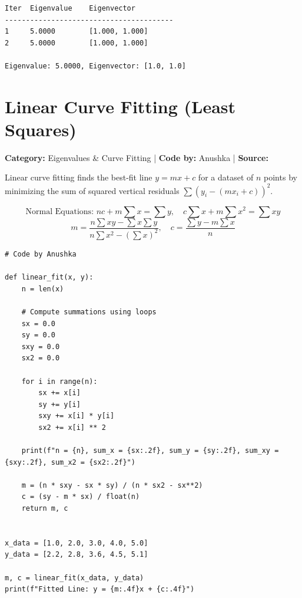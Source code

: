 \documentclass[10pt,a4paper]{report}
\begin{document}
\begin{tcolorbox}[colback=termbg,colframe=primary,title=\textbf{Program Execution Output \& Convergence Table},boxrule=1pt,arc=2mm]
\begin{lstlisting}[style=terminal_output]
Iter  Eigenvalue    Eigenvector         
----------------------------------------
1     5.0000        [1.000, 1.000]      
2     5.0000        [1.000, 1.000]      

Eigenvalue: 5.0000, Eigenvector: [1.0, 1.0]
\end{lstlisting}
\end{tcolorbox}

\newpage

\section{Linear Curve Fitting (Least Squares)}
\textbf{Category:} \textcolor{secondary}{Eigenvalues \& Curve Fitting} \quad | \quad \textbf{Code by:} \textcolor{secondary}{Anushka} \quad | \quad \textbf{Source:} \texttt{}

Linear curve fitting finds the best-fit line $y = mx + c$ for a dataset of $n$ points by minimizing the sum of squared vertical residuals $\sum (y_i - (mx_i + c))^2$.

\begin{tcolorbox}[colback=theorybg,colframe=theoryframe,title=\textbf{Mathematical Theory \& Formulation},boxrule=1pt,arc=2mm]
\[
\text{Normal Equations: } n c + m \sum x = \sum y, \quad c \sum x + m \sum x^2 = \sum x y
\]
\[
m = \frac{n \sum xy - \sum x \sum y}{n \sum x^2 - (\sum x)^2}, \quad c = \frac{\sum y - m \sum x}{n}
\]
\end{tcolorbox}

\begin{tcolorbox}[colback=codebg,colframe=secondary,title=\textbf{Python Implementation (Step-by-Step Loops \& Pure Functions)},boxrule=1pt,arc=2mm]
\begin{lstlisting}[style=python_detailed]
# Code by Anushka

def linear_fit(x, y):
    n = len(x)

    # Compute summations using loops
    sx = 0.0
    sy = 0.0
    sxy = 0.0
    sx2 = 0.0

    for i in range(n):
        sx += x[i]
        sy += y[i]
        sxy += x[i] * y[i]
        sx2 += x[i] ** 2

    print(f"n = {n}, sum_x = {sx:.2f}, sum_y = {sy:.2f}, sum_xy = {sxy:.2f}, sum_x2 = {sx2:.2f}")

    m = (n * sxy - sx * sy) / (n * sx2 - sx**2)
    c = (sy - m * sx) / float(n)
    return m, c


x_data = [1.0, 2.0, 3.0, 4.0, 5.0]
y_data = [2.2, 2.8, 3.6, 4.5, 5.1]

m, c = linear_fit(x_data, y_data)
print(f"Fitted Line: y = {m:.4f}x + {c:.4f}")

\end{lstlisting}
\end{tcolorbox}
\end{document}
